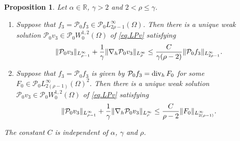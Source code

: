 \documentclass[11pt,a4paper]{article}
\numberwithin{equation}{section}
\newtheorem{proposition}[theorem]{Proposition}
{\theorembodyfont{\rmfamily}\newtheorem{remark}[theorem]{Remark}}
{\theorembodyfont{\rmfamily}\newtheorem{remarks}[theorem]{Remarks}}
\newcommand{\R}{\mathbb{R}}
\newcommand{\opdiv}{\operatorname{div}}
\newcommand{\h}{{\rm h}}
\begin{document}
%
\begin{proposition}\label{prop.LPz.zero}
Let $\alpha\in\R$, $\gamma>2$ and $2<\rho\le\gamma$. 
%
\begin{enumerate}[(1)]
\item\label{item1.prop.LPz.zero}
Suppose that $f_3={\mathcal P}_0 f_3\in {\mathcal P}_0 L^\infty_{2\rho-1}(\Omega)$. Then there is a unique weak solution ${\mathcal P}_0 v_3\in {\mathcal P}_0 W^{1,2}_0(\Omega)$ of \eqref{eq.LPv} satisfying 
%
\begin{align}\label{est1.prop.LPz.zero}
\|{\mathcal P}_0 v_3\|_{L^\infty_{\rho-1}} 
+ \frac{1}{\gamma} \|\nabla_\h {\mathcal P}_0 v_3\|_{L^\infty_{\rho}} 
\le 
\frac{C}{\gamma(\rho-2)}
\|{\mathcal P}_0 f_3\|_{L^\infty_{2\rho-1}}. 
\end{align}
%


\item\label{item2.prop.LPz.zero}
Suppose that $f_3={\mathcal P}_0 f_3$ is given by ${\mathcal P}_0 f_3=\opdiv_\h F_0$ for some $F_0\in {\mathcal P}_0 L^\infty_{2(\rho-1)}(\Omega)^2$. Then there is a unique weak solution ${\mathcal P}_0 v_3\in {\mathcal P}_0 W^{1,2}_0(\Omega)$ of \eqref{eq.LPv} satisfying 
%
\begin{align}\label{est2.prop.LPz.zero}
\|{\mathcal P}_0 v_3\|_{L^\infty_{\rho-1}} 
+ \frac{1}{\gamma} \|\nabla_\h {\mathcal P}_0 v_3\|_{L^\infty_{\rho}} 
\le 
\frac{C}{\rho-2} \|F_0\|_{L^\infty_{2(\rho-1)}}. 
\end{align}
%
\end{enumerate}
%
The constant $C$ is independent of $\alpha$, $\gamma$ and $\rho$.
\end{proposition}
%
%
\end{document}
